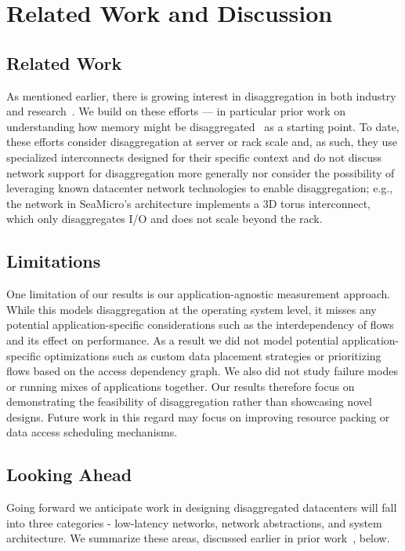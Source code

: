 \section{Related Work and Discussion}
\label{sec:discussion}

\subsection{Related Work}
As mentioned earlier, there is growing interest in disaggregation in both industry and research~\cite{hptm, seamicro, fdr, rsa, firebox, sonuma, ddcHwDesign1, ddcHwDesign2, ddcHwDesign3, hotnets}. We build on these efforts --– in particular prior work on understanding how memory might be disaggregated~\cite{ddcHwDesign2, ddcHwDesign3} as a starting point. To date, these efforts consider disaggregation at server or rack scale and, as such, they use specialized interconnects designed for their specific context and do not discuss network support for disaggregation more generally nor consider the possibility of leveraging known datacenter network technologies to enable disaggregation; e.g., the network in SeaMicro’s architecture implements a 3D torus interconnect, which only disaggregates I/O and does not scale beyond the rack.

\subsection{Limitations}
One limitation of our results is our application-agnostic measurement approach. While this models disaggregation at the operating system level, it misses any potential application-specific considerations such as the interdependency of flows and its effect on performance. As a result we did not model potential application-specific optimizations such as custom data placement strategies or prioritizing flows based on the access dependency graph. We also did not study failure modes or running mixes of applications together. Our results therefore focus on demonstrating the feasibility of disaggregation rather than showcasing novel designs. Future work in this regard may focus on improving resource packing or data access scheduling mechanisms.

\subsection{Looking Ahead}
Going forward we anticipate work in designing disaggregated datacenters will fall into three categories - low-latency networks, network abstractions, and system architecture. We summarize these areas, discussed earlier in prior work~\cite{hotnets}, below.

